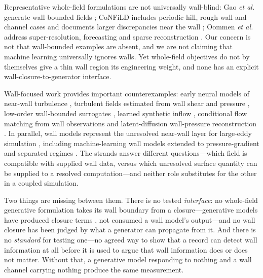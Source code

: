 Representative whole-field formulations are not universally wall-blind: Gao \emph{et al.}
generate wall-bounded fields
\cite{gao2023bayesian}; CoNFiLD includes periodic-hill, rough-wall and channel cases and
documents larger discrepancies near the wall \cite{du2024confild}; Oommen \emph{et al.} address
super-resolution, forecasting and sparse reconstruction
\cite{fukami2019jfm,fukami2021nmi,kim2021unsupervised,oommen2026learning}. Our concern
is not that wall-bounded examples are absent, and we are not claiming that machine learning
universally ignores walls. Yet whole-field objectives do not by
themselves give a thin wall region its engineering weight, and none has an explicit
wall-closure-to-generator interface.

Wall-focused work provides important counterexamples: early neural models of near-wall
turbulence \cite{milano2002neural}, turbulent fields estimated from wall shear and pressure
\cite{guastoni2021convolutional,guemes2021coarse,cuellar2024three}, low-order wall-bounded
surrogates \cite{srinivasan2019predictions,nakamura2021convolutional}, learned synthetic inflow
\cite{wu2017inflow,fukami2019synthetic,kim2020deep}, conditional flow matching from wall
observations \cite{parikh2026conditional} and latent-diffusion wall-pressure reconstruction
\cite{fan2025wallpressure}. In parallel, wall models represent the unresolved near-wall layer for
large-eddy simulation \cite{kawai2012wall,yang2015integral,park2014improved,yang2017llm,bae2019dynamic},
including machine-learning wall models \cite{yang2019predictive,bae2022scientific} extended to
pressure-gradient and separated regimes \cite{lozanoduran2023building,dupuy2023wallmodel}. The
strands answer different questions---which field is compatible with supplied wall data, versus
which unresolved surface quantity can be supplied to a resolved computation---and neither role
substitutes for the other in a coupled simulation.

Two things are missing between them. There is no tested \emph{interface}: no whole-field generative
formulation takes its wall boundary from a closure---generative models have
produced closure terms \cite{dong2025stochclosure}, not consumed a wall model's output---and
no wall closure has been judged by what a generator can propagate from it. And there is no \emph{standard} for testing one---no agreed way
to show that a record can detect wall information at all before it is used to argue that wall
information does or does not matter. Without that, a generative model responding to nothing and a
wall channel carrying nothing produce the same measurement.


